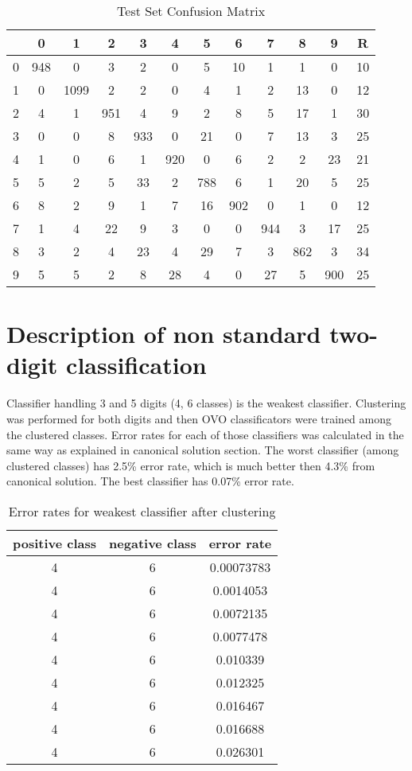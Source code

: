 \documentclass[a4paper, 11pt, wide]{article}
\begin{document}
  \begin{table}[H]
  \begin{center}
  \begin{tabular}{ |c|c c c c c c c c c c|c| } 
  \hline
   & 0 & 1 & 2 & 3 & 4 & 5 & 6 & 7 & 8 & 9 & R\\ 
  \hline
   0 & 948 & 0 & 3 & 2 & 0 & 5 & 10 & 1 & 1 & 0 & 10 \\
	 1 & 0 & 1099 & 2 & 2 & 0 & 4 & 1 & 2 & 13 & 0 & 12 \\
	 2 & 4 & 1 & 951 & 4 & 9 & 2 & 8 & 5 & 17 & 1 & 30 \\
	 3 & 0 & 0 & 8 & 933 & 0 & 21 & 0 & 7 & 13 & 3 & 25 \\
	 4 & 1 & 0 & 6 & 1 & 920 & 0 & 6 & 2 & 2 & 23 & 21 \\
	 5 & 5 & 2 & 5 & 33 & 2 & 788 & 6 & 1 & 20 & 5 & 25 \\
	 6 & 8 & 2 & 9 & 1 & 7 & 16 & 902 & 0 & 1 & 0 & 12 \\
	 7 & 1 & 4 & 22 & 9 & 3 & 0 & 0 & 944 & 3 & 17 & 25 \\
	 8 & 3 & 2 & 4 & 23 & 4 & 29 & 7 & 3 & 862 & 3 & 34 \\
	 9 & 5 & 5 & 2 & 8 & 28 & 4 & 0 & 27 & 5 & 900 & 25 \\
   \hline
  \end{tabular}
  \end{center}
  \caption{Test Set Confusion Matrix}
  \end{table}
  \section{Description of non standard two-digit classification}
  Classifier handling 3 and 5 digits (4, 6 classes) is the weakest classifier.
  Clustering was performed for both digits and then OVO classificators were
  trained among the clustered classes. Error rates for each of those classifiers 
  was calculated in the same way as explained in canonical solution section.
  The worst classifier (among clustered classes) has 2.5\% error rate, which is
  much better then 4.3\% from canonical solution. The best classifier has 0.07\% error rate.
  \begin{table}[H]
  \begin{center}
\begin{tabular}{ |c|c|c| } 
 \hline
 positive class & negative class & error rate \\ 
 \hline
	 4 & 6 & 0.00073783  \\
	 4 & 6 & 0.0014053  \\
	 4 & 6 & 0.0072135  \\
	 4 & 6 & 0.0077478  \\
	 4 & 6 & 0.010339  \\
	 4 & 6 & 0.012325  \\
	 4 & 6 & 0.016467  \\
	 4 & 6 & 0.016688  \\
	 4 & 6 & 0.026301  \\
 \hline
\end{tabular}
\caption{Error rates for weakest classifier after clustering}
\end{center}
\end{table}
\end{document}
